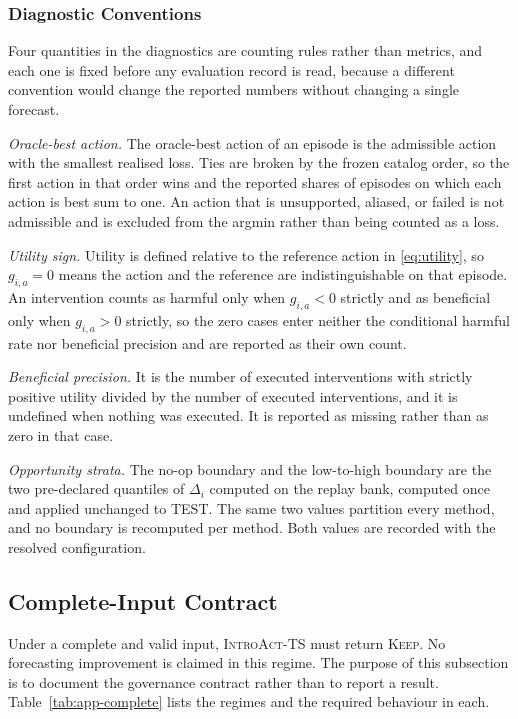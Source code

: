 \documentclass{article}
\newcommand{\introact}{\textsc{IntroAct-TS}}
\begin{document}
\subsubsection{Diagnostic Conventions}
\label{app:diagnostic-conventions}
Four quantities in the diagnostics are counting rules rather than metrics, and each one is
fixed before any evaluation record is read, because a different convention would change the
reported numbers without changing a single forecast.

\emph{Oracle-best action.} The oracle-best action of an episode is the admissible action with
the smallest realised loss. Ties are broken by the frozen catalog order, so the first action in
that order wins and the reported shares of episodes on which each action is best sum to one. An
action that is unsupported, aliased, or failed is not admissible and is excluded from the
argmin rather than being counted as a loss.

\emph{Utility sign.} Utility is defined relative to the reference action in
\eqref{eq:utility}, so $g_{i,a} = 0$ means the action and the reference are indistinguishable on
that episode. An intervention counts as harmful only when $g_{i,a} < 0$ strictly and as
beneficial only when $g_{i,a} > 0$ strictly, so the zero cases enter neither the conditional
harmful rate nor beneficial precision and are reported as their own count.

\emph{Beneficial precision.} It is the number of executed interventions with strictly positive
utility divided by the number of executed interventions, and it is undefined when nothing was
executed. It is reported as missing rather than as zero in that case.

\emph{Opportunity strata.} The no-op boundary and the low-to-high boundary are the two
pre-declared quantiles of $\Delta_i$ computed on the replay bank, computed once and applied
unchanged to TEST. The same two values partition every method, and no boundary is recomputed
per method. Both values are recorded with the resolved configuration.

\subsection{Complete-Input Contract}
\label{app:contract}
Under a complete and valid input, \introact{} must return \textsc{Keep}. No forecasting
improvement is claimed in this regime. The purpose of this subsection is to document the
governance contract rather than to report a result. Table~\ref{tab:app-complete} lists the
regimes and the required behaviour in each.
\end{document}
